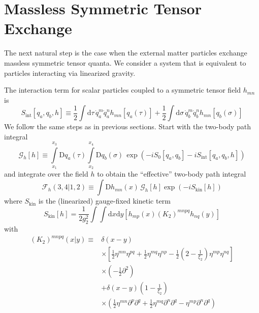 \section{Massless Symmetric Tensor Exchange\label{SecMasslessTen4}}
The next natural step is the case when the external matter particles exchange massless symmetric tensor quanta. We consider a system that is equivalent to particles interacting via linearized gravity.

The interaction term for scalar particles coupled to a symmetric tensor field $h_{mn}$ is
\begin{equation}
	S_{\text{int}}[q_{a}, q_{b}, h] \equiv \frac{1}{2} \int \mathrm{d}\tau \, \dot{q}_{a}^{m} \dot{q}_{a}^{n} h_{mn}[q_{a}(\tau)] + \frac{1}{2} \int \mathrm{d}\sigma \, \dot{q}_{b}^{m} \dot{q}_{b}^{n} h_{mn}[q_{b}(\sigma)] \label{SintTen}
\end{equation}
We follow the same steps as in previous sections. Start with the two-body path integral
\begin{equation}
	\mathcal{G}_{h}[h] \equiv \int\limits_{x_{1}}^{x_{3}} \mathrm{D}q_{a}(\tau) \int\limits_{x_{2}}^{x_{4}} \mathrm{D}q_{b}(\sigma) \, \exp{\left(- i S_{0}[q_{a}, q_{b}] - i S_{\text{int}}[q_{a}, q_{b}, h] \right)}
\end{equation}
and integrate over the field $h$ to obtain the ``effective'' two-body path integral
\begin{equation}
	\mathcal{F}_{h}(3,4|1,2) \equiv \int \mathrm{D}h_{mn}(x) \, \mathcal{G}_{h}[h] \exp{\left( -i S_{\text{kin}}[h] \right)}
\end{equation}
where $S_{\text{kin}}$ is the (linearized) gauge-fixed kinetic term
\begin{equation}
	S_{\text{kin}}[h] = \frac{1}{2g_{2}^{2}} \int \int \mathrm{d} x \mathrm{d}y \left[ h_{mp}(x) (K_{2})^{mnpq} h_{nq}(y) \right] \label{SkinTen}
\end{equation}
with
\begin{equation}
\begin{split}
	(K_{2})^{mnpq}(x|y) \equiv {}& \delta(x - y) \\
	&\times \left[ \frac{1}{2} \eta^{mn} \eta^{pq} + \frac{1}{2} \eta^{mq} \eta^{np} - \frac{1}{2} \left(2 - \frac{1}{\xi_{2}} \right) \eta^{mp} \eta^{nq} \right] \\
	&\times \left(- \frac{1}{2} \partial^{2} \right) \\
	&+ \delta(x - y) \left(1 - \frac{1}{\xi_{2}} \right) \\
	&\times \left( \frac{1}{2} \eta^{mn} \partial^{p} \partial^{q} + \frac{1}{2} \eta^{mq} \partial^{n} \partial^{q} - \eta^{mp} \partial^{n} \partial^{q} \right)
\end{split}
\end{equation}
